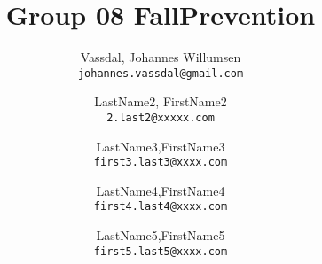 \documentclass[12pt,a4paper]{report}
\title{Group 08 FallPrevention}
\author{
  Vassdal, Johannes Willumsen\\
  \texttt{johannes.vassdal@gmail.com}
  \and
  LastName2, FirstName2\\
  \texttt{2.last2@xxxxx.com}
  \and
  LastName3,FirstName3\\
  \texttt{first3.last3@xxxx.com}
    \and
  LastName4,FirstName4\\
  \texttt{first4.last4@xxxx.com}
    \and
  LastName5,FirstName5\\
  \texttt{first5.last5@xxxx.com}
}
\begin{document}
\onehalfspacing
\maketitle
\tableofcontents








\end{document}

